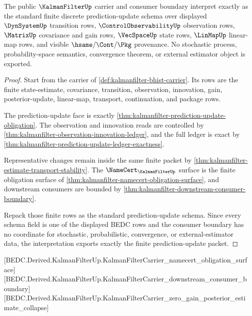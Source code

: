\begin{theorem}
\label{thm:kalmanfilter-standard-prediction-update-bridge}
The public $\KalmanFilterUp$ carrier and consumer boundary interpret exactly as
the standard finite discrete prediction-update schema over displayed
$\DynSystemUp$ transition rows, $\ControlObservabilityUp$ observation rows,
$\MatrixUp$ covariance and gain rows, $\VecSpaceUp$ state rows, $\LinMapUp$
linear-map rows, and visible $\hsame/\Cont/\Pkg$ provenance. No stochastic
process, probability-space semantics, convergence theorem, or external
estimator object is exported.
\end{theorem}
\begin{proof}
Start from the carrier of \autoref{def:kalmanfilter-bhist-carrier}. Its rows are
the finite state-estimate, covariance, transition, observation, innovation, gain,
posterior-update, linear-map, transport, continuation, and package rows.

The prediction-update face is exactly
\autoref{thm:kalmanfilter-prediction-update-obligation}. The observation and
innovation reads are controlled by
\autoref{thm:kalmanfilter-observation-innovation-ledger}, and the full ledger is
exact by \autoref{thm:kalmanfilter-prediction-update-ledger-exactness}.

Representative changes remain inside the same finite packet by
\autoref{thm:kalmanfilter-estimate-transport-stability}. The
$\NameCert_{\KalmanFilterUp}$ surface is the finite obligation surface of
\autoref{thm:kalmanfilter-namecert-obligation-surface}, and downstream consumers
are bounded by \autoref{thm:kalmanfilter-downstream-consumer-boundary}.

Repack those finite rows as the standard prediction-update schema. Since every
schema field is one of the displayed BEDC rows and the consumer boundary has no
coordinate for stochastic, probabilistic, convergence, or external-estimator
data, the interpretation exports exactly the finite prediction-update packet.
\end{proof}

[BEDC.Derived.KalmanFilterUp.KalmanFilterCarrier\_namecert\_obligation\_surface]
[BEDC.Derived.KalmanFilterUp.KalmanFilterCarrier\_downstream\_consumer\_boundary]
[BEDC.Derived.KalmanFilterUp.KalmanFilterCarrier\_zero\_gain\_posterior\_estimate\_collapse]

